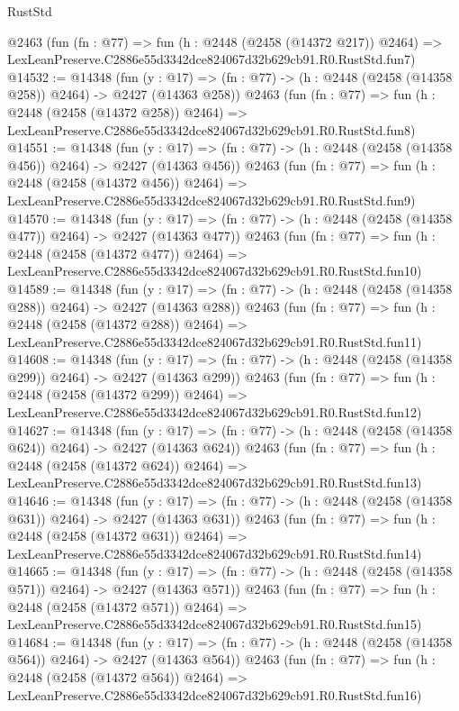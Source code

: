 \begin{lexlean}{RustStd}
\begin{coremodule}
    @2463
    (fun (fn : @77) =>
    fun (h : @2448 (@2458 (@14372 @217)) @2464) =>
    LexLeanPreserve.C2886e55d3342dce824067d32b629cb91.R0.RustStd.fun7)
@14532 := @14348
    (fun (y : @17) => (fn : @77) -> (h : @2448 (@2458 (@14358 @258)) @2464) -> @2427 (@14363 @258))
    @2463
    (fun (fn : @77) =>
    fun (h : @2448 (@2458 (@14372 @258)) @2464) =>
    LexLeanPreserve.C2886e55d3342dce824067d32b629cb91.R0.RustStd.fun8)
@14551 := @14348
    (fun (y : @17) => (fn : @77) -> (h : @2448 (@2458 (@14358 @456)) @2464) -> @2427 (@14363 @456))
    @2463
    (fun (fn : @77) =>
    fun (h : @2448 (@2458 (@14372 @456)) @2464) =>
    LexLeanPreserve.C2886e55d3342dce824067d32b629cb91.R0.RustStd.fun9)
@14570 := @14348
    (fun (y : @17) => (fn : @77) -> (h : @2448 (@2458 (@14358 @477)) @2464) -> @2427 (@14363 @477))
    @2463
    (fun (fn : @77) =>
    fun (h : @2448 (@2458 (@14372 @477)) @2464) =>
    LexLeanPreserve.C2886e55d3342dce824067d32b629cb91.R0.RustStd.fun10)
@14589 := @14348
    (fun (y : @17) => (fn : @77) -> (h : @2448 (@2458 (@14358 @288)) @2464) -> @2427 (@14363 @288))
    @2463
    (fun (fn : @77) =>
    fun (h : @2448 (@2458 (@14372 @288)) @2464) =>
    LexLeanPreserve.C2886e55d3342dce824067d32b629cb91.R0.RustStd.fun11)
@14608 := @14348
    (fun (y : @17) => (fn : @77) -> (h : @2448 (@2458 (@14358 @299)) @2464) -> @2427 (@14363 @299))
    @2463
    (fun (fn : @77) =>
    fun (h : @2448 (@2458 (@14372 @299)) @2464) =>
    LexLeanPreserve.C2886e55d3342dce824067d32b629cb91.R0.RustStd.fun12)
@14627 := @14348
    (fun (y : @17) => (fn : @77) -> (h : @2448 (@2458 (@14358 @624)) @2464) -> @2427 (@14363 @624))
    @2463
    (fun (fn : @77) =>
    fun (h : @2448 (@2458 (@14372 @624)) @2464) =>
    LexLeanPreserve.C2886e55d3342dce824067d32b629cb91.R0.RustStd.fun13)
@14646 := @14348
    (fun (y : @17) => (fn : @77) -> (h : @2448 (@2458 (@14358 @631)) @2464) -> @2427 (@14363 @631))
    @2463
    (fun (fn : @77) =>
    fun (h : @2448 (@2458 (@14372 @631)) @2464) =>
    LexLeanPreserve.C2886e55d3342dce824067d32b629cb91.R0.RustStd.fun14)
@14665 := @14348
    (fun (y : @17) => (fn : @77) -> (h : @2448 (@2458 (@14358 @571)) @2464) -> @2427 (@14363 @571))
    @2463
    (fun (fn : @77) =>
    fun (h : @2448 (@2458 (@14372 @571)) @2464) =>
    LexLeanPreserve.C2886e55d3342dce824067d32b629cb91.R0.RustStd.fun15)
@14684 := @14348
    (fun (y : @17) => (fn : @77) -> (h : @2448 (@2458 (@14358 @564)) @2464) -> @2427 (@14363 @564))
    @2463
    (fun (fn : @77) =>
    fun (h : @2448 (@2458 (@14372 @564)) @2464) =>
    LexLeanPreserve.C2886e55d3342dce824067d32b629cb91.R0.RustStd.fun16)

\end{coremodule}
\end{lexlean}
